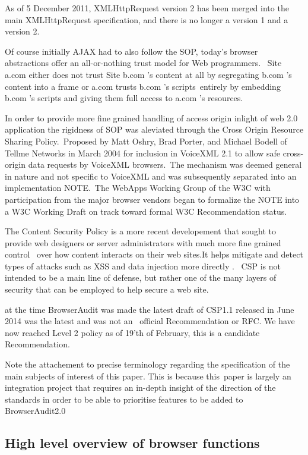 \documentclass[a4paper,12pt]{paper}
\begin{document}
As of 5 December 2011, XMLHttpRequest version 2 has been merged into the main XMLHttpRequest specification, and there is no longer a version 1 and a version 2.\

Of course initially AJAX had to also follow the SOP, today’s browser abstractions offer an all-or-nothing trust model for Web programmers. \
Site a.com either does not trust Site b.com ’s content at all by segregating b.com ’s content into a frame or a.com trusts b.com ’s scripts\
entirely by embedding b.com ’s scripts and giving them full access to a.com ’s resources.\

In order to provide more fine grained handling of access origin inlight of web 2.0 application the rigidness of SOP was aleviated through the Cross Origin Resource Sharing Policy.\
Proposed by Matt Oshry, Brad Porter, and Michael Bodell of Tellme Networks in March 2004 for inclusion in VoiceXML 2.1 to allow safe cross-origin data requests by VoiceXML browsers.\
The mechanism was deemed general in nature and not specific to VoiceXML and was subsequently separated into an implementation NOTE.\
The WebApps Working Group of the W3C with participation from the major browser vendors began to formalize the NOTE into a W3C Working Draft on track toward formal W3C Recommendation status.\

The Content Security Policy is a more recent developement that sought to provide web designers or server administrators with much more fine grained control \
over how content interacts on their web sites.It helps mitigate and detect types of attacks such as XSS and data injection more directly . \
CSP is not intended to be a main line of defense, but rather one of the many layers of security that can be employed to help secure a web site.\

at the time BrowserAudit was made the latest draft of CSP1.1 released in June 2014 was the latest and was not an \
official Recommendation or RFC. We have now reached Level 2 policy as of 19'th of February,\cite{csp} this is a candidate Recommendation.\

Note the attachement to precise terminology regarding the specification of the main subjects of interest of this paper. This is because this\ 
paper is largely an integration project that requires an in-depth insight of the direction of the standards in order to be able to prioritise features to be added to BrowserAudit2.0\

\subsection{High level overview of browser functions}
\end{document}
